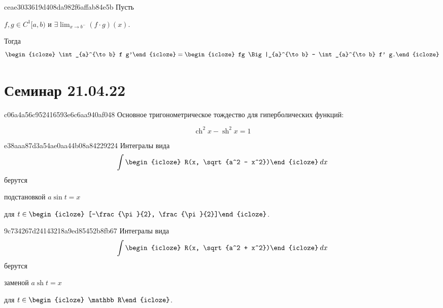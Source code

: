 \begin{note}{ceae3033619d408da982f6affab84e5b}
    Пусть \begin{icloze}{3}\({ f, g \in C^{1} [a, b) }\) и \({ \exists \displaystyle \lim_{x \to b^{-}} (f \cdot g)(x) }\).\end{icloze}
    Тогда
    \[
        \begin{icloze}{2}\int_{a}^{\to b} f g'\end{icloze}
        =
        \begin{icloze}{1}fg \Big|_{a}^{\to b} - \int_{a}^{\to b} f' g.\end{icloze}
    \]
\end{note}

\section{Семинар 21.04.22}
\begin{note}{c06a4a56c952416593e6c6aa940af048}
    Основное тригонометрическое тождество для гиперболических функций:
    \begin{icloze}{1}
        \[
            \operatorname{ch}^2 x - \operatorname{sh}^2 x = 1
        \]
    \end{icloze}
\end{note}

\begin{note}{e38aaa87d3a54ae0aa44b08a84229224}
    Интегралы вида
    \[
        \int \begin{icloze}{2}R(x, \sqrt{a^2 - x^2})\end{icloze}\: dx
    \]
    берутся \begin{icloze}{1}подстановкой \({ a \sin t = x }\)\end{icloze} для \({ t \in \begin{icloze}{3}[-\frac{\pi}{2}, \frac{\pi}{2}]\end{icloze} }\).
\end{note}

\begin{note}{9c734267d24143218a9ed85452b8fb67}
    Интегралы вида
    \[
        \int \begin{icloze}{2}R(x, \sqrt{a^2  + x^2})\end{icloze}\: dx
    \]
    берутся \begin{icloze}{1}заменой \({ a \operatorname{sh} t = x }\)\end{icloze} для \({ t \in \begin{icloze}{3}\mathbb R\end{icloze} }\).
\end{note}

